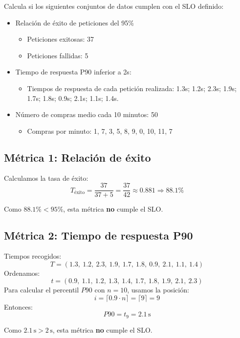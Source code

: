\begin{enunciado}
    Calcula si los siguientes conjuntos de datos cumplen con el SLO definido:
    \begin{itemize}
        \item Relación de éxito de peticiones del 95\%
        \begin{itemize}
            \item Peticiones exitosas: 37
            \item Peticiones fallidas: 5
        \end{itemize}
        \item Tiempo de respuesta P90 inferior a 2s:
        \begin{itemize}
            \item Tiempos de respuesta de cada petición realizada: 1.3s; 1.2s; 2.3s; 1.9s; 1.7s; 1.8s; 0.9s; 2.1s; 1.1s; 1.4s.
        \end{itemize}
        \item Número de compras medio cada 10 minutos: 50
        \begin{itemize}
            \item Compras por minuto: 1, 7, 3, 5, 8, 9, 0, 10, 11, 7
        \end{itemize}
    \end{itemize}
\end{enunciado}

\subsection{Métrica 1: Relación de éxito}\label{subsec:metrica-1:-relacion-de-exito}
Calculamos la tasa de éxito:
\[
    T_{\text{éxito}} = \frac{37}{37 + 5} = \frac{37}{42} \approx 0.881 \Rightarrow 88.1\%
\]

\begin{solucion}[parte 1]
    Como $88.1\% < 95\%$, esta métrica \textbf{no} cumple el SLO\@.
\end{solucion}

\subsection{Métrica 2: Tiempo de respuesta P90}\label{subsec:metrica-2:-tiempo-de-respuesta-p90}
Tiempos recogidos:
\[
    T = (1.3,\ 1.2,\ 2.3,\ 1.9,\ 1.7,\ 1.8,\ 0.9,\ 2.1,\ 1.1,\ 1.4)
\]
Ordenamos:
\[
    t = (0.9,\ 1.1,\ 1.2,\ 1.3,\ 1.4,\ 1.7,\ 1.8,\ 1.9,\ 2.1,\ 2.3)
\]
Para calcular el percentil $P90$ con $n = 10$, usamos la posición:
\[
    i = \lceil 0.9 \cdot n \rceil = \lceil 9 \rceil = 9
\]
Entonces:
\[
    P90 = t_9 = 2.1\,\text{s}
\]
\begin{solucion}[parte 2]

    Como $2.1\,\text{s} > 2\,\text{s}$, esta métrica \textbf{no} cumple el SLO\@.
\end{solucion}

